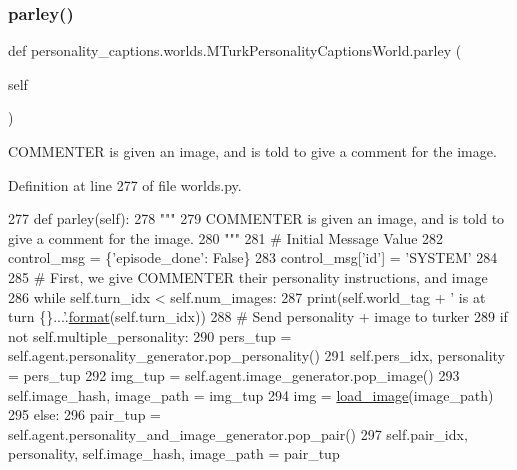 \subsubsection{\texorpdfstring{parley()}{parley()}}
{\footnotesize\ttfamily def personality\+\_\+captions.\+worlds.\+M\+Turk\+Personality\+Captions\+World.\+parley (\begin{DoxyParamCaption}\item[{}]{self }\end{DoxyParamCaption})}

\begin{DoxyVerb}COMMENTER is given an image, and is told to give a comment for the image.
\end{DoxyVerb}
 

Definition at line 277 of file worlds.\+py.


\begin{DoxyCode}
277     \textcolor{keyword}{def }parley(self):
278         \textcolor{stringliteral}{"""}
279 \textcolor{stringliteral}{        COMMENTER is given an image, and is told to give a comment for the image.}
280 \textcolor{stringliteral}{        """}
281         \textcolor{comment}{# Initial Message Value}
282         control\_msg = \{\textcolor{stringliteral}{'episode\_done'}: \textcolor{keyword}{False}\}
283         control\_msg[\textcolor{stringliteral}{'id'}] = \textcolor{stringliteral}{'SYSTEM'}
284 
285         \textcolor{comment}{# First, we give COMMENTER their personality instructions, and image}
286         \textcolor{keywordflow}{while} self.turn\_idx < self.num\_images:
287             print(self.world\_tag + \textcolor{stringliteral}{' is at turn \{\}...'}.\hyperlink{namespaceparlai_1_1chat__service_1_1services_1_1messenger_1_1shared__utils_a32e2e2022b824fbaf80c747160b52a76}{format}(self.turn\_idx))
288             \textcolor{comment}{# Send personality + image to turker}
289             \textcolor{keywordflow}{if} \textcolor{keywordflow}{not} self.multiple\_personality:
290                 pers\_tup = self.agent.personality\_generator.pop\_personality()
291                 self.pers\_idx, personality = pers\_tup
292                 img\_tup = self.agent.image\_generator.pop\_image()
293                 self.image\_hash, image\_path = img\_tup
294                 img = \hyperlink{namespacepersonality__captions_1_1worlds_a2863737d97a8e8c5a1ebe9029d0d2293}{load\_image}(image\_path)
295             \textcolor{keywordflow}{else}:
296                 pair\_tup = self.agent.personality\_and\_image\_generator.pop\_pair()
297                 self.pair\_idx, personality, self.image\_hash, image\_path = pair\_tup

\end{DoxyCode}
